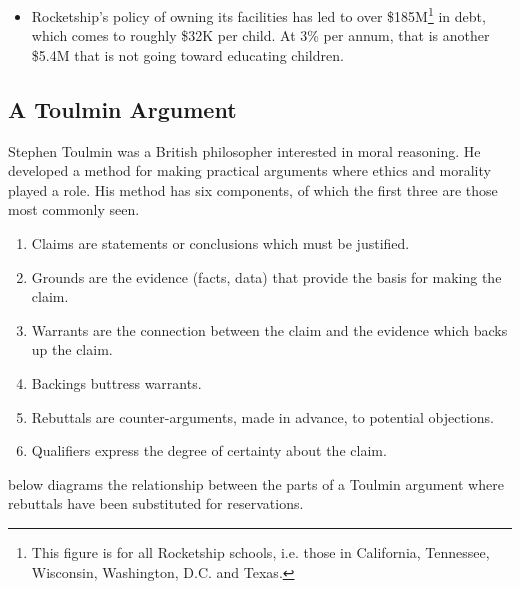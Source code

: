 \begin{enumerate}[topsep=0.3\baselineskip,itemsep=0.25\baselineskip]
\begin{itemize}[topsep=0.125\baselineskip,itemsep=0.25\baselineskip]
      \item Rocketship's policy of owning its facilities has led to over \$185M\footnote{This figure is for all Rocketship schools, i.e. those in  California, Tennessee, Wisconsin, Washington, D.C. and Texas.} in debt, which comes to roughly \$32K per child. At 3\% per annum, that is another \$5.4M that is not going toward educating children.
    \end{itemize}
\end{enumerate}

\subsection{A Toulmin Argument}%
\label{sec:toulmin-arguments}\indent%

Stephen Toulmin was a British philosopher interested in moral reasoning. He developed a method for making practical arguments where ethics and morality played a role. His method has six components, of which the first three are those most commonly seen.
\begin{enumerate}[topsep=0.3\baselineskip,itemsep=0.25\baselineskip]
  \item Claims are statements or conclusions which must be justified.
  \item Grounds are the evidence (facts, data) that provide the basis for making the claim.
  \item Warrants are the connection between the claim and the evidence which backs up the claim.
  \item Backings buttress warrants.
  \item Rebuttals are counter-arguments, made in advance, to potential objections.
  \item Qualifiers express the degree of certainty about the claim.
\end{enumerate}

 below diagrams the relationship between the parts of a Toulmin argument where rebuttals have been substituted for reservations.

